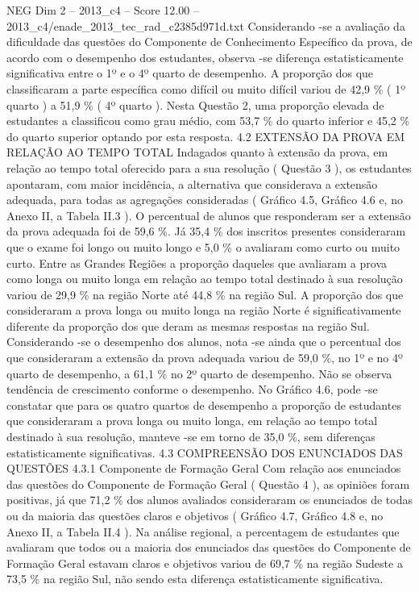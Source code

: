\begin{textsample}{NEG Dim 2 – 2013\_c4 – Score 12.00 – 2013\_c4/enade\_2013\_tec\_rad\_c2385d971d.txt}
Considerando -se a avaliação da dificuldade das questões do Componente de Conhecimento Específico da prova, de acordo com o desempenho dos estudantes, observa -se diferença estatisticamente significativa entre o 1º e o 4º quarto de desempenho.
A proporção dos que classificaram a parte específica como difícil ou muito difícil variou de 42,9 \% ( 1º quarto ) a 51,9 \% ( 4º quarto ).
Nesta Questão 2, uma proporção elevada de estudantes a classificou como grau médio, com 53,7 \% do quarto inferior e 45,2 \% do quarto superior optando por esta resposta. 4.2 EXTENSÃO DA PROVA EM RELAÇÃO AO TEMPO TOTAL Indagados quanto à extensão da prova, em relação ao tempo total oferecido para a sua resolução ( Questão 3 ), os estudantes apontaram, com maior incidência, a alternativa que considerava a extensão adequada, para todas as agregações consideradas ( Gráfico 4.5, Gráfico 4.6 e, no Anexo II, a Tabela II.3 ).
O percentual de alunos que responderam ser a extensão da prova adequada foi de 59,6 \%.
Já 35,4 \% dos inscritos presentes consideraram que o exame foi longo ou muito longo e 5,0 \% o avaliaram como curto ou muito curto.
Entre as Grandes Regiões a proporção daqueles que avaliaram a prova como longa ou muito longa em relação ao tempo total destinado à sua resolução variou de 29,9 \% na região Norte até 44,8 \% na região Sul.
A proporção dos que consideraram a prova longa ou muito longa na região Norte é significativamente diferente da proporção dos que deram as mesmas respostas na região Sul.
Considerando -se o desempenho dos alunos, nota -se ainda que o percentual dos que consideraram a extensão da prova adequada variou de 59,0 \%, no 1º e no 4º quarto de desempenho, a 61,1 \% no 2º quarto de desempenho.
Não se observa tendência de crescimento conforme o desempenho.
No Gráfico 4.6, pode -se constatar que para os quatro quartos de desempenho a proporção de estudantes que consideraram a prova longa ou muito longa, em relação ao tempo total destinado à sua resolução, manteve -se em torno de 35,0 \%, sem diferenças estatisticamente significativas. 4.3 COMPREENSÃO DOS ENUNCIADOS DAS QUESTÕES 4.3.1 Componente de Formação Geral Com relação aos enunciados das questões do Componente de Formação Geral ( Questão 4 ), as opiniões foram positivas, já que 71,2 \% dos alunos avaliados consideraram os enunciados de todas ou da maioria das questões claros e objetivos ( Gráfico 4.7, Gráfico 4.8 e, no Anexo II, a Tabela II.4 ).
Na análise regional, a percentagem de estudantes que avaliaram que todos ou a maioria dos enunciados das questões do Componente de Formação Geral estavam claros e objetivos variou de 69,7 \% na região Sudeste a 73,5 \% na região Sul, não sendo esta diferença estatisticamente significativa.

\end{textsample}
